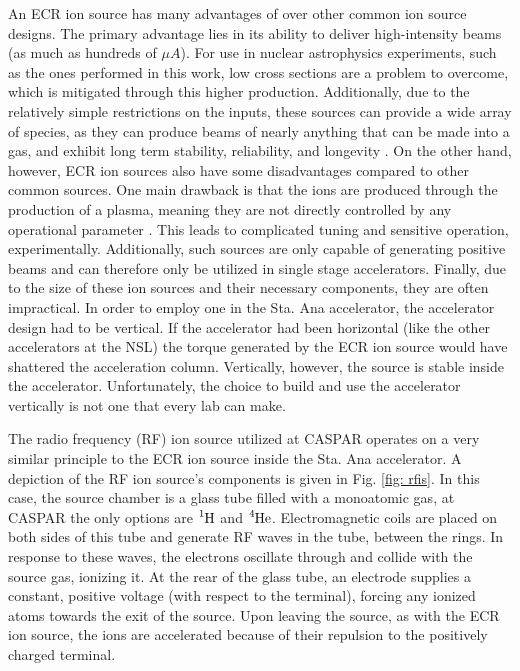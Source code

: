 An ECR ion source has many advantages of over other common ion source designs. The primary advantage lies in its ability to deliver high-intensity beams (as much as hundreds of $\mu A$). For use in nuclear astrophysics experiments, such as the ones performed in this work, low cross sections are a problem to overcome, which is mitigated through this higher production. Additionally, due to the relatively simple restrictions on the inputs, these sources can provide a wide array of species, as they can produce beams of nearly anything that can be made into a gas, and exhibit long term stability, reliability, and longevity \cite{Melin1997}.  On the other hand, however, ECR ion sources also have some disadvantages compared to other common sources. One main drawback is that the ions are produced through the production of a plasma, meaning they are not directly controlled by any operational parameter \cite{Melin1997}. This leads to complicated tuning and sensitive operation, experimentally. Additionally, such sources are only capable of generating positive beams and can therefore only be utilized in single stage accelerators. Finally, due to the size of these ion sources and their necessary components, they are often impractical. In order to employ one in the Sta. Ana accelerator, the accelerator design had to be vertical. If the accelerator had been horizontal (like the other accelerators at the NSL) the torque generated by the ECR ion source would have shattered the acceleration column. Vertically, however, the source is stable inside the accelerator. Unfortunately, the choice to build and use the accelerator vertically is not one that every lab can make. 

The radio frequency (RF) ion source utilized at CASPAR operates on a very similar principle to the ECR ion source inside the Sta. Ana accelerator. A depiction of the RF ion source's components is given in Fig. \ref{fig: rfis}. In this case, the source chamber is a glass tube filled with a monoatomic gas, at CASPAR the only options are $\ce{^{1}H}$ and $\ce{^{4}He}$.  Electromagnetic coils are placed on both sides of this tube and generate RF waves in the tube, between the rings. In response to these waves, the electrons oscillate through and collide with the source gas, ionizing it. At the rear of the glass tube, an electrode supplies a constant, positive voltage (with respect to the terminal), forcing any ionized atoms towards the exit of the source. Upon leaving the source, as with the ECR ion source, the ions are accelerated because of their repulsion to the positively charged terminal. 

